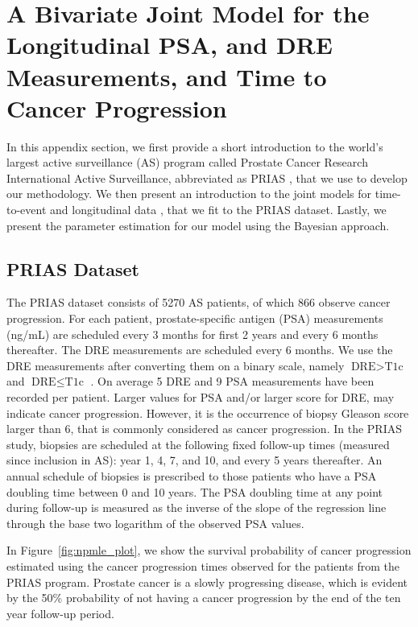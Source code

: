 \section{A Bivariate Joint Model for the Longitudinal PSA, and DRE Measurements, and Time to Cancer Progression}
\label{sec:jm_framework}

In this appendix section, we first provide a short introduction to the world's largest active surveillance (AS) program called Prostate Cancer Research International Active Surveillance, abbreviated as PRIAS \citep{bokhorst2016decade}, that we use to develop our methodology. We then present an introduction to the joint models for time-to-event and longitudinal data \citep{tsiatis2004joint,rizopoulos2012joint}, that we fit to the PRIAS dataset. Lastly, we present the parameter estimation for our model using the Bayesian approach. 

\subsection{PRIAS Dataset}
The PRIAS dataset consists of 5270 AS patients, of which 866 observe cancer progression. For each patient, prostate-specific antigen (PSA) measurements (ng/mL) are scheduled every 3 months for first 2 years and every 6 months thereafter. The DRE measurements are scheduled every 6 months. We use the DRE measurements after converting them on a binary scale, namely ${\mbox{DRE} > \mbox{T1c}}$ and ${\mbox{DRE} \leq \mbox{T1c}}$ \citep{schroder1992tnm}. On average 5 DRE and 9 PSA measurements have been recorded per patient. Larger values for PSA and/or larger score for DRE, may indicate cancer progression. However, it is the occurrence of biopsy Gleason score larger than 6, that is commonly considered as cancer progression. In the PRIAS study, biopsies are scheduled at the  following fixed follow-up times (measured since inclusion in AS): year 1, 4, 7, and 10, and every 5 years thereafter. An annual schedule of biopsies is prescribed to those patients who have a PSA doubling time between 0 and 10 years. The PSA doubling time at any point during follow-up is measured as the inverse of the slope of the regression line through the base two logarithm of the observed PSA values.

In Figure~\ref{fig:npmle_plot}, we show the survival probability of cancer progression estimated using the cancer progression times observed for the patients from the PRIAS program. Prostate cancer is a slowly progressing disease, which is evident by the 50\% probability of not having a cancer progression by the end of the ten year follow-up period.

